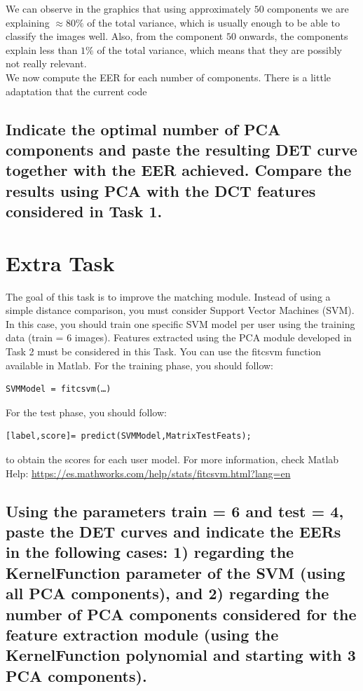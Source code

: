 \documentclass[a4paper]{article}
\begin{document}
We can observe in the graphics that using approximately \(50\) components we are explaining \(\approx 80\%\) of the total variance, which is usually enough to be able to classify the images well. Also, from the component \(50\) onwards, the components explain less than \(1\%\) of the total variance, which means that they are possibly not really relevant.\\

We now compute the EER for each number of components. There is a little adaptation that the current code 


\subsection{ Indicate the optimal number of PCA components and paste the resulting DET curve together with the EER achieved. Compare the results using PCA with the DCT features considered in Task 1.}




\section{Extra Task}

The goal of this task is to improve the matching module. Instead of using a simple distance comparison, you must consider Support Vector Machines (SVM). In this case, you should train one specific SVM model per user using the training data (train = 6 images).
Features extracted using the PCA module developed in Task 2 must be considered in this Task. 
You can use the fitcsvm function available in Matlab. For the training phase, you should follow:
\begin{verbatim}
SVMModel = fitcsvm(…)
\end{verbatim}
For the test phase, you should follow:
\begin{verbatim}
[label,score]= predict(SVMModel,MatrixTestFeats);
\end{verbatim}
to obtain the scores for each user model. 
For more information, check Matlab Help:
\url{https://es.mathworks.com/help/stats/fitcsvm.html?lang=en} 
\subsection{ Using the parameters train = 6 and test = 4, paste the DET curves and indicate the EERs in the following cases: 1) regarding the KernelFunction parameter of the SVM (using all PCA components), and 2) regarding the number of PCA components considered for the feature extraction module (using the KernelFunction polynomial and starting with 3 PCA components).}
\end{document}

